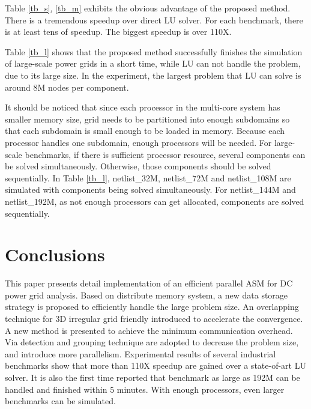 \documentclass{sig-alternate}
\begin{document}
	Table \ref{tb_s}, \ref{tb_m} exhibits the obvious advantage of the proposed method. There is a tremendous 
	speedup over direct LU solver. For each benchmark, there is at least tens of speedup. The biggest speedup is over 110X. 

	Table \ref{tb_l} shows that the proposed method successfully finishes the simulation of large-scale power grids
	in a short time, while LU can not handle the problem, due to its large size. In the experiment, the largest problem that LU can solve is 
	around 8M nodes per component. 

	It should be noticed that since each processor in the multi-core system has smaller memory size, grid needs to be 
	partitioned into enough subdomains so that each subdomain is small enough to be loaded in memory. Because each processor handles 
	one 
	subdomain, enough processors will be needed. For large-scale benchmarks, if there is sufficient processor resource, several 
	components can be solved simultaneously. Otherwise, those components should be 
	solved sequentially. In Table \ref{tb_l}, netlist\_32M, netlist\_72M and netlist\_108M are 
	simulated with components being solved simultaneously. For netlist\_144M and 
	netlist\_192M, as not enough processors can get allocated, components are solved sequentially.

\section{Conclusions}
	This paper presents detail implementation of an efficient parallel ASM for DC power grid analysis. Based on distribute memory 
	system, a new data storage strategy is proposed to efficiently handle the large problem size. An overlapping technique for 3D 
	irregular grid friendly introduced to accelerate the convergence. A new method is presented to achieve the minimum communication overhead. Via 
	detection and grouping technique are adopted to decrease the problem size, and introduce more parallelism. Experimental 
	results of several industrial benchmarks show that more than 110X speedup are gained over a state-of-art LU solver. It is also 
	the first time reported that benchmark as large as 192M can be handled and finished within 5 minutes. With enough processors, 
	even larger benchmarks can be simulated.



\end{document}
